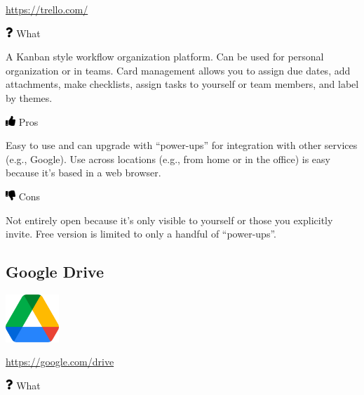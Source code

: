 \documentclass[
  letterpaper,
  DIV=11,
  numbers=noendperiod]{scrreprt}
\begin{document}
\url{https://trello.com/}

\includegraphics[width=0.75em,height=1em]{./collaborate_files/figure-pdf/fa-icon-8447cf12acba1bc263badfefa79f6dd7.pdf}
What

A Kanban style workflow organization platform. Can be used for personal
organization or in teams. Card management allows you to assign due
dates, add attachments, make checklists, assign tasks to yourself or
team members, and label by themes.

\includegraphics[width=1em,height=1em]{./collaborate_files/figure-pdf/fa-icon-e4ee65476be467d7be8a1ae9cb02ffda.pdf}
Pros

Easy to use and can upgrade with ``power-ups'' for integration with
other services (e.g., Google). Use across locations (e.g., from home or
in the office) is easy because it's based in a web browser.

\includegraphics[width=1em,height=1em]{./collaborate_files/figure-pdf/fa-icon-c9ddf618df48250f2c0ed0cb59d4f20d.pdf}
Cons

Not entirely open because it's only visible to yourself or those you
explicitly invite. Free version is limited to only a handful of
``power-ups''.

\hypertarget{google-drive}{%
\subsection{Google Drive}\label{google-drive}}

\includegraphics[width=0.15\textwidth,height=\textheight]{./img/Google_Drive_logo.png}

\url{https://google.com/drive}

\includegraphics[width=0.75em,height=1em]{./collaborate_files/figure-pdf/fa-icon-8447cf12acba1bc263badfefa79f6dd7.pdf}
What
\end{document}
